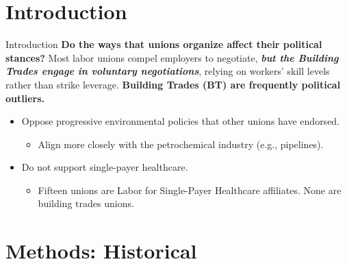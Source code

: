 \documentclass{beamer}
\begin{document}
\section*{Introduction}
\begin{frame}{Introduction}
\textbf{Do the ways that unions organize affect their political stances?}\newline\newline %
Most labor unions compel employers to negotiate, \textit{\textbf{but the Building Trades engage in voluntary negotiations}}, relying on workers' skill levels rather than strike leverage. 
	\newline\newline
	\textbf{Building Trades (BT) are frequently political outliers.}
	\begin{itemize}
		\item Oppose progressive environmental policies that other unions have endorsed.
		\begin{itemize}
			\item Align more closely with the petrochemical industry (e.g., pipelines).
		\end{itemize}
		\item Do not support single-payer healthcare.
		\begin{itemize}
			\item Fifteen unions are Labor for Single-Payer Healthcare affiliates. None are building trades unions.
		\end{itemize}
	\end{itemize}
	
\end{frame}

\section*{Methods: Historical}
\end{document}
